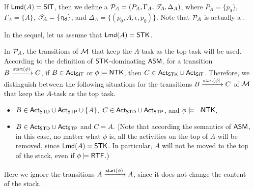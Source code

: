 If ${\sf Lmd}(A) = \mathsf{SIT}$, then we define a {\WOTrPDS} ${\mathcal{P} }_A  = (P_A, \Gamma_A, {\mathscr{T} }_A, \Delta_A)$, where $P_A = \{p_0\}$, $\Gamma_A = \{A\}$, ${\mathscr{T} }_A = \{\tau_{\mathsf{id}}\}$, and $\Delta_A = \{(p_0, A, \epsilon, p_0)\}$. Note that ${\mathcal{P} }_A$ is actually a {\PDS}. 

In the sequel, let us assume that ${\sf Lmd}(A) = \mathsf{STK}$. 

In ${\mathcal{P} }_A$, the transitions of ${\mathcal{M} }$ that keep the $A$-task as the top task will be used. According to the definition of ${\sf STK}$-dominating $\textsf{ASM}$, for a transition $B \xrightarrow{{\mathsf{start} }(\phi)} C$, if $B \in {\sf Act}_{\sf SIT}$ or $\phi \models {\sf NTK}$, then $C \in {\sf Act}_{\sf STK} \cup {\sf Act}_{\sf SIT}$. Therefore, we distinguish between the following situations for the transitions $B \xrightarrow{{\mathsf{start} }(\phi)} C$ of ${\mathcal{M} }$ that keep the $A$-task as the top task. 
\begin{itemize}
\item $B \in {\sf Act}_{\sf STD} \cup {\sf Act}_{\sf STP} \cup \{A\}$, $C \in {\sf Act}_{\sf STD} \cup {\sf Act}_{\sf STP}$, and $\phi \models \neg {\sf NTK}$,
%
\item $B \in {\sf Act}_{\sf STD} \cup {\sf Act}_{\sf STP}$ and $C = A$. (Note that according the semantics of $\textsf{ASM}$, in this case, no matter what $\phi$ is, all the activities on the top of $A$ will be removed, since ${\sf Lmd}(A) = {\sf STK}$. In particular, $A$ will not be moved to the top of the stack, even if $\phi \models {\sf RTF}$.)
\end{itemize}
Here we ignore the transitions $A \xrightarrow{{\mathsf{start} }(\phi)} A$, since it does not change the content of the stack. 

